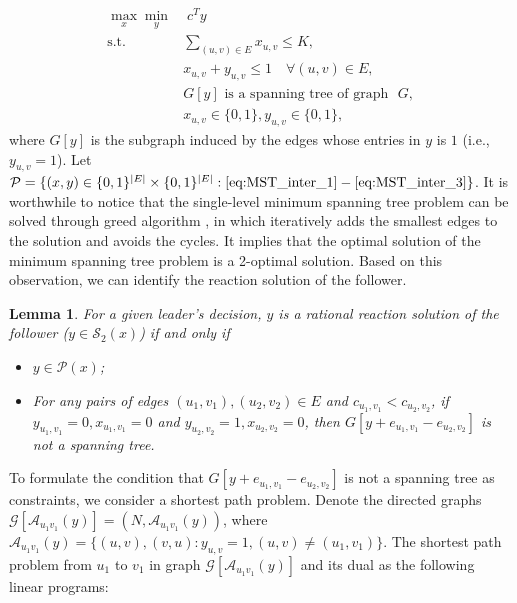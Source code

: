 \documentclass[11pt]{article}
\newtheorem{lemma}{Lemma}
\newcommand{\G}{\mathcal{G}}
\newcommand{\Pp}{\mathcal{P}}
\newcommand{\Ss}{\mathcal{S}}
\newcommand{\Aa}{\mathcal{A}}
\begin{document}
\begin{subequations}
	\begin{align}
	\max_x\min_y &\; c^T y \nonumber\\
	\text{s.t.~}&  \sum_{(u,v)\in E} x_{u,v} \leq K, \label{eq:MST_inter_1}\\
	& x_{u,v} + y_{u,v} \leq 1 \quad \forall (u,v)\in E,\\
	& G[y] \text{~is a spanning tree of graph~ } G, \label{eq:MST_inter_3}\\
	& x_{u,v} \in \{0,1\}, y_{u,v} \in \{0, 1\}, \nonumber
	\end{align}
\end{subequations}
where $G[y]$ is the subgraph induced by the edges whose entries in $y$ is $1$ (i.e., $y_{u,v} =1 $).  Let $\Pp = \{(x, y) \in \{0,1\}^{|E|}\times \{0,1\}^{|E|}: \eqref{eq:MST_inter_1} - \eqref{eq:MST_inter_3} \}$. It is worthwhile to notice that the single-level minimum spanning tree problem can be solved through greed algorithm \cite{ahuja1988network}, in which iteratively adds the smallest edges to the solution and avoids the cycles. It implies that the optimal solution of the minimum spanning tree problem is a 2-optimal solution. Based on this observation, we can identify the reaction solution of the follower.
\begin{lemma}
	For a given leader's decision, $y$ is a rational reaction solution of the follower ($y \in \Ss_2(x)$) if and only if 
	\begin{itemize}
		\item[\emph{(i)}] $y \in \Pp(x)$;
		\item[\emph{(ii)}] For any pairs of edges $(u_1, v_1), (u_2, v_2) \in E$ and $c_{u_1,v_1} < c_{u_2,v_2}$, if $y_{u_1,v_1} = 0, x_{u_1,v_1}=0$ and $y_{u_2,v_2} = 1, x_{u_2,v_2}=0$, then $G[y + e_{u_1,v_1} - e_{u_2,v_2}]$ is not a spanning tree. 
	\end{itemize}
\end{lemma}

To formulate the condition that $G[y + e_{u_1,v_1} - e_{u_2,v_2}]$ is not a spanning tree as constraints, we consider a shortest path problem. Denote the directed graphs $\G[\Aa_{u_1v_1}(y)] = (N, \Aa_{u_1v_1}(y))$, where $\Aa_{u_1v_1}(y) = \{(u,v), (v, u): y_{u,v}=1, (u,v)\neq (u_1, v_1)\}$. The shortest path problem from $u_1$ to $v_1$ in graph $\G[\Aa_{u_1v_1}(y)]$ and its dual as the following linear programs:
\end{document}
